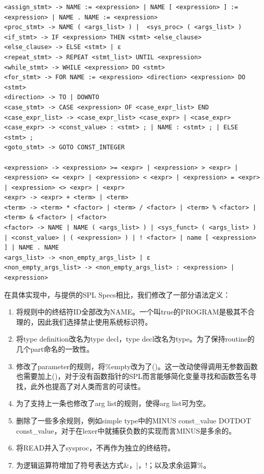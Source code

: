 \documentclass{article}
\begin{document}
\begin{lstlisting}
<assign_stmt> -> NAME := <expression> | NAME [ <expression> ] := <expression> | NAME . NAME := <expression>
<proc_stmt> -> NAME ( <args_list> ) |  <sys_proc> ( <args_list> )
<if_stmt> -> IF <expression> THEN <stmt> <else_clause>
<else_clause> -> ELSE <stmt> | ε
<repeat_stmt> -> REPEAT <stmt_list> UNTIL <expression>
<while_stmt> -> WHILE <expression> DO <stmt>
<for_stmt> -> FOR NAME := <expression> <direction> <expression> DO <stmt>
<direction> -> TO | DOWNTO
<case_stmt> -> CASE <expression> OF <case_expr_list> END
<case_expr_list> -> <case_expr_list> <case_expr> | <case_expr> 
<case_expr> -> <const_value> : <stmt> ; | NAME : <stmt> ; | ELSE <stmt> ;
<goto_stmt> -> GOTO CONST_INTEGER

<expression> -> <expression> >= <expr> | <expression> > <expr> | <expression> <= <expr> | <expression> < <expr> | <expression> = <expr> | <expression> <> <expr> | <expr>
<expr> -> <expr> + <term> | <term>
<term> -> <term> * <factor> | <term> / <factor> | <term> % <factor> | <term> & <factor> | <factor>
<factor> -> NAME | NAME ( <args_list> ) | <sys_funct> ( <args_list> ) | <const_value> | ( <expression> ) | ! <factor> | name [ <expression> ] | NAME . NAME
<args_list> -> <non_empty_args_list> | ε
<non_empty_args_list> -> <non_empty_args_list> : <expression> | <expression>
\end{lstlisting}

\par 在具体实现中，与提供的SPL Specs相比，我们修改了一部分语法定义：

\begin{enumerate}
  \item 将规则中的终结符ID全部改为NAME。一个叫true的PROGRAM是极其不合理的，因此我们选择禁止使用系统标识符。
  \item 将type definition改名为type decl，type decl改名为type。为了保持routine的几个part命名的一致性。
  \item 修改了parameter的规则，将\%empty改为了()。这一改动使得调用无参数函数也需要加上()，对于没有函数指针的SPL而言能够简化变量寻找和函数签名寻找，此外也提高了对人类而言的可读性。
  \item 为了支持上一条也修改了arg list的规则，使得arg list可为空。
  \item 删除了一些多余规则，例如simple type中的MINUS const\_value DOTDOT const\_value，对于在lexer中就捕获负数的实现而言MINUS是多余的。
  \item 将READ并入了sysproc，不再作为独立的终结符。
  \item 为逻辑运算符增加了符号表达方式\&，|，!；以及求余运算\%。
\end{enumerate}
\end{document}
